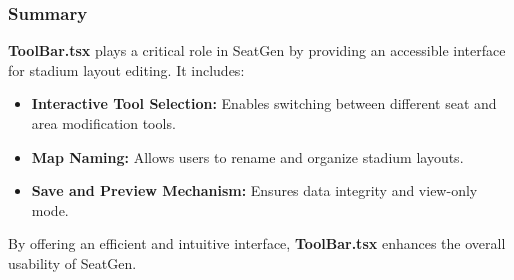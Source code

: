 \subsubsection{Summary}
\textbf{ToolBar.tsx} plays a critical role in SeatGen by providing an accessible interface for stadium layout editing. It includes:
\begin{itemize}
    \item \textbf{Interactive Tool Selection:} Enables switching between different seat and area modification tools.
    \item \textbf{Map Naming:} Allows users to rename and organize stadium layouts.
    \item \textbf{Save and Preview Mechanism:} Ensures data integrity and view-only mode.
\end{itemize}

By offering an efficient and intuitive interface, \textbf{ToolBar.tsx} enhances the overall usability of SeatGen.
